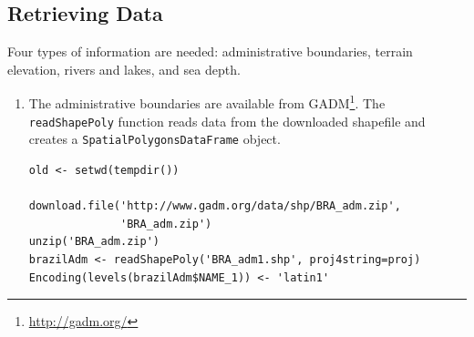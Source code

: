 \documentclass[smallroyalvopaper]{memoir}
\begin{document}
\subsection{Retrieving Data}
\label{sec-1-1}
Four types of information are needed: administrative boundaries,
terrain elevation, rivers and lakes, and sea depth.


\begin{enumerate}
\item The administrative boundaries are available from GADM\footnote{\url{http://gadm.org/}}. The
\texttt{readShapePoly} function reads data from the downloaded shapefile
and creates a \texttt{SpatialPolygonsDataFrame} object.
\lstset{language=R,numbers=none}
\begin{lstlisting}
old <- setwd(tempdir())

download.file('http://www.gadm.org/data/shp/BRA_adm.zip',
              'BRA_adm.zip')
unzip('BRA_adm.zip')
brazilAdm <- readShapePoly('BRA_adm1.shp', proj4string=proj)
Encoding(levels(brazilAdm$NAME_1)) <- 'latin1'
\end{lstlisting}


\end{enumerate}
\end{document}
